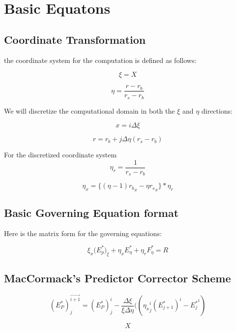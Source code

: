 \documentclass{article}
\begin{document}
\section{Basic Equatons}

\subsection{Coordinate Transformation}

the coordinate system for the computation is defined as follows:

\[
{\xi} = {X}
\]
\par{}
\[
{\eta} = \frac{{r} - {r_b}}{{r_s} - {r_b}}
\]
\par{}

We will discretize the computational domain in both the $\xi$ and $\eta$ directions:

\[
{x} = {i}{\Delta}{\xi}
\]
\par{}
\[
{r} = {r_b} + {j}{\Delta}{\eta}({r_s} - {r_b})
\]

For the discretized coordinate system
\[
{\eta_r} = \frac{1}{{r_s} - {r_b}}
\]
\par{}
\[
{\eta_x} = \{(\eta - 1){r_b}_x -{\eta}{r_s}_x\}*{\eta_r}
\]
\par{}
\subsection{Basic Governing Equation format}

Here is the matrix form for the governing equations:

\[ {\xi_x}({{E^*_p})_\xi} + {\eta_x}{E^*_\eta} + {\eta_r}{F^*_\eta} = {R} \]
\par{}

\subsection{MacCormack's Predictor Corrector Scheme}
\[
({E^*_P})^{\overrightarrow{{i+1}}}_{j} = ({E^*_P})^{i}_{j} -
\frac{\Delta\xi}{\xi\Delta\eta}(
({\eta_x}^i_j({E^*_{j+1}})^i - {E^*_j}^i
)
\]

\[
X
\]
\end{document}

